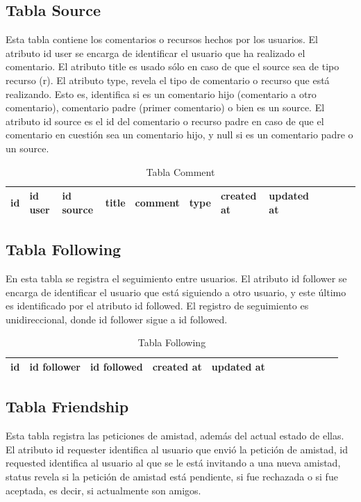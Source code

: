 \documentclass[12pt,letterpaper]{article}
\begin{document}
\subsection{Tabla Source}
Esta tabla contiene los comentarios o recursos hechos por los usuarios. El atributo id user se encarga de identificar el usuario que ha realizado el comentario. El atributo title es usado sólo en caso de que el source sea de tipo recurso (r). El atributo type, revela el tipo de comentario o recurso que está realizando. Esto es, identifica si es un comentario hijo (comentario a otro comentario), comentario padre (primer comentario) o bien es un source. El atributo id source es el id del comentario o recurso padre en caso de que el comentario en cuestión sea un comentario hijo, y null si es un comentario padre o un source. 

\begin{table}[!ht]  
\begin{center}	
	\begin{tabular}{||c|l|l|l|l|l|l|l|l|l|l|l||} \hline 
	id & id user & id source & title & comment & type & created at & updated at \\ \hline
	\end{tabular}
	\caption {Tabla Comment}
\end{center}  
\end{table}

\subsection{Tabla Following}
En esta tabla se registra el seguimiento entre usuarios. El atributo id follower se encarga de identificar el usuario que está siguiendo a otro usuario, y este último es identificado por el atributo id followed. El registro de seguimiento es unidireccional, donde id follower sigue a id followed.

\begin{table}[!ht]  
\begin{center}	
	\begin{tabular}{||c|l|l|l|l|l|l|l|l|l|l|l||} \hline 
	id & id follower & id followed & created at & updated at \\ \hline
	\end{tabular}
	\caption {Tabla Following}
\end{center}  
\end{table}

\subsection{Tabla Friendship}
Esta tabla registra las peticiones de amistad, además del actual estado de ellas. El atributo id requester identifica al usuario que envió la petición de amistad, id requested identifica al usuario al que se le está invitando a una nueva amistad, status revela si la petición de amistad está pendiente, si fue rechazada o si fue aceptada, es decir, si actualmente son amigos.
\end{document}
